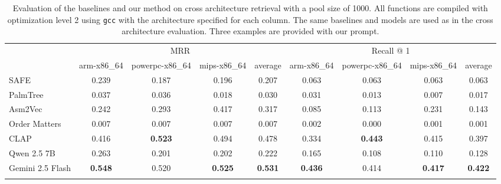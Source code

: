 \documentclass[conference,compsoc]{IEEEtran}
\begin{document}
{
    \renewcommand{\arraystretch}{1.3}

    \begin{table}[!t]
    \centering
    \begin{tabular}{l|cccc|cccc}
    \Xhline{2\arrayrulewidth}
    \multirow{2}{*}{Model} & \multicolumn{4}{c|}{MRR}                                 & \multicolumn{4}{c}{Recall @ 1}                           \\ \cline{2-9}
                           & arm-x86\_64 & powerpc-x86\_64 & mips-x86\_64 & average   & arm-x86\_64 & powerpc-x86\_64 & mips-x86\_64 & average   \\ \hline
    SAFE                   & 0.239       & 0.187           & 0.196        & 0.207     & 0.063       & 0.063           & 0.063        & 0.063     \\
    PalmTree               & 0.037       & 0.036           & 0.018        & 0.030     & 0.031       & 0.013           & 0.007        & 0.017     \\
    Asm2Vec                & 0.242       & 0.293           & 0.417        & 0.317     & 0.085       & 0.113           & 0.231        & 0.143     \\
    Order Matters          & 0.007       & 0.007           & 0.007        & 0.007     & 0.002       & 0.000           & 0.001        & 0.001     \\
    CLAP                   & 0.416       & \bf 0.523       & 0.494        & 0.478     & 0.334       & \bf 0.443       & 0.415        & 0.397     \\ \hline
    Qwen 2.5 7B            & 0.263       & 0.201           & 0.202        & 0.222     & 0.165       & 0.108           & 0.110        & 0.128     \\
    Gemini 2.5 Flash       & \bf 0.548   & 0.520           & \bf 0.525    & \bf 0.531 & \bf 0.436   & 0.414           & \bf 0.417    & \bf 0.422 \\ \Xhline{2\arrayrulewidth}
    \end{tabular}
    \caption{Evaluation of the baselines and our method on cross architecture retrieval with a pool size of 1000.
    All functions are compiled with optimization level 2 using \texttt{gcc} with the architecture specified for each column.
    The same baselines and models are used as in the cross architecture evaluation. Three examples are provided with our prompt.}
    \label{x-arch}
    \end{table}
}
\end{document}
